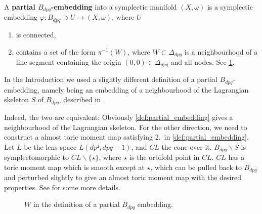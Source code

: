 \documentclass[12pt,a4paper,abstract=true,draft]{scrartcl}
\begin{document}
\begin{definition}
    \label{def:partial_embedding}
    A \textbf{partial $B_{dpq}$-embedding} into a symplectic manifold $(X,\omega)$ is a symplectic embedding $φ\colon B_{dpq} ⊃ U → (X,ω)$, where $U$ 
    \begin{enumerate}
        \item is connected, 
        \item contains a set of the form $\pi^{-1}(W)$, where $W \subset \Delta_{dpq}$ is a neighbourhood of a line segment containing the origin $(0,0) \in \Delta_{dpq}$ and all nodes.
 See \cref{fig:partial-Bdpq-embedding}.   
    \end{enumerate}
\end{definition}

\begin{remark}
  In the Introduction we used a slightly different definition of a partial $B_{dpq}$-embedding, namely being an embedding of a neighbourhood of the Lagrangian skeleton $S$ of $B_{dpq}$, described in \cite[Remark 7.10]{evans2021atfs}.

  Indeed, the two are equivalent:
  Obviously \cref{def:partial_embedding} gives a neighbourhood of the Lagrangian skeleton.
  For the other direction, we need to construct a almost toric moment map satisfying 2.\ in \cref{def:partial_embedding}.
  Let $L$ be the lens space $L(dp²,dpq-1)$, and $CL$ the cone over it.
  $B_{dpq} ∖ S$ is symplectomorphic to $C L ∖ \{ ⋆\}$, where $⋆$ is the orbifold point in $CL$.
  $CL$ has a toric moment map which is smooth except at $⋆$, which can be pulled back to $B_{dpq}$ and perturbed slightly to give an almost toric moment map with the desired properties.
  See \cite{Eva19} for some more details.
\end{remark}

\begin{figure}
    \centering
    \caption{$W$ in the definition of a partial $B_{dpq}$ embedding.}
    \label{fig:partial-Bdpq-embedding}
\end{figure}
\end{document}
